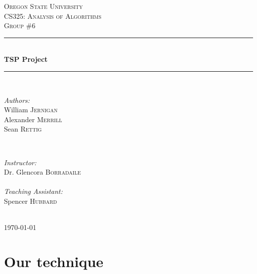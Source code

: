 \documentclass{article}
\begin{document}
\begin{titlepage}

\newcommand{\HRule}{\rule{\linewidth}{0.5mm}} %

\center %
 
\textsc{\LARGE Oregon State University}\\[1.5cm] %
\textsc{\Large CS325: Analysis of Algorithms}\\[0.5cm] %
\textsc{\large Group \#6}\\[0.5cm] %

\HRule \\[0.4cm]
{ \huge \bfseries TSP Project}\\[0.4cm] %
\HRule \\[1.5cm]

\begin{minipage}{0.4\textwidth}
\begin{flushleft} \large
\emph{Authors:}\\
William \textsc{Jernigan}\\
Alexander \textsc{Merrill}\\
Sean \textsc{Rettig}
\end{flushleft}
\end{minipage}
~
\begin{minipage}{0.4\textwidth}
\begin{flushright} \large
\emph{Instructor:} \\
Dr. Glencora \textsc{Borradaile}\\
\emph{\\Teaching Assistant:} \\
Spencer \textsc{Hubbard}
\end{flushright}
\end{minipage}\\[4cm]

{\large \today}\\[3cm] %

\vfill %

\end{titlepage}
\section*{Our technique}
\end{document}
